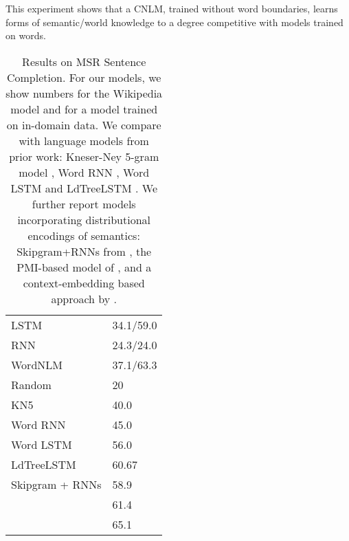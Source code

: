 This experiment shows that a CNLM, trained without word boundaries, learns forms of semantic/world knowledge to a degree competitive with models trained on words.

\begin{table}[t]
  \begin{center}
    \begin{tabular}{l|l}
        LSTM 	    &      34.1/59.0 \\ %
	    RNN  &     24.3/24.0 \\ %
	    WordNLM & 37.1/63.3 \\ \hline \hline %
	    Random & 20 \\ \hline
	    KN5   & 40.0 \\
            Word RNN & 45.0 \\
	    Word LSTM & 56.0 \\ 
	    LdTreeLSTM  & 60.67 \\	    \hline
Skipgram + RNNs  & 58.9 \\
            \citet{woods2016exploiting} &  61.4 \\
\citet{melamud2016context2vec} & 65.1 \\
    \end{tabular}
  \end{center}
	\caption{\label{tab:msr-completion-results} Results on MSR Sentence Completion. For our models, we show numbers for the Wikipedia model and for a model trained on in-domain data. We compare with language models from prior work: Kneser-Ney 5-gram model \cite{Mikolov:2012}, Word RNN \cite{zweig2012computational}, Word LSTM and LdTreeLSTM \cite{zhang2016top}. We further report models incorporating distributional encodings of semantics: Skipgram+RNNs from , the PMI-based model of \citet{woods2016exploiting}, and a context-embedding based approach by \citet{melamud2016context2vec}.}
\end{table}



